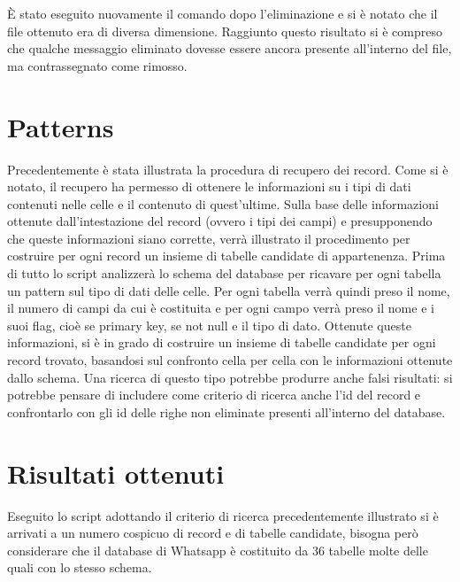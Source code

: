 È stato eseguito nuovamente il comando dopo l'eliminazione e si è notato che il file ottenuto era di diversa dimensione. Raggiunto questo risultato si è compreso che qualche messaggio eliminato dovesse essere ancora presente all'interno del file, ma contrassegnato come rimosso.

\section{Patterns}
Precedentemente è stata illustrata la procedura di recupero dei record. Come si è notato, il recupero ha permesso di ottenere le informazioni su i tipi di dati contenuti nelle celle e il contenuto di quest'ultime.
Sulla base delle informazioni ottenute dall'intestazione del record (ovvero i tipi dei campi) e presupponendo che queste informazioni siano corrette, verrà illustrato il procedimento per costruire per ogni record un insieme di tabelle candidate di appartenenza. 
Prima di tutto lo script analizzerà lo schema del database per ricavare per ogni tabella un pattern sul tipo di dati delle celle. Per ogni tabella verrà quindi preso il nome, il numero di campi da cui è costituita e per ogni campo verrà preso il nome e i suoi flag, cioè se primary key, se not null e il tipo di dato.
Ottenute queste informazioni, si è in grado di costruire un insieme di tabelle candidate per ogni record trovato, basandosi sul confronto cella per cella con le informazioni ottenute dallo schema.
Una ricerca di questo tipo potrebbe produrre anche falsi risultati: si potrebbe pensare di includere come criterio di ricerca anche l'id del record e confrontarlo con gli id delle righe non eliminate presenti all'interno del database.

\section{Risultati ottenuti}
Eseguito lo script adottando il criterio di ricerca precedentemente illustrato si è arrivati a un numero cospicuo di record e di tabelle candidate, bisogna però considerare che il database di Whatsapp è costituito da 36 tabelle molte delle quali con lo stesso schema.

